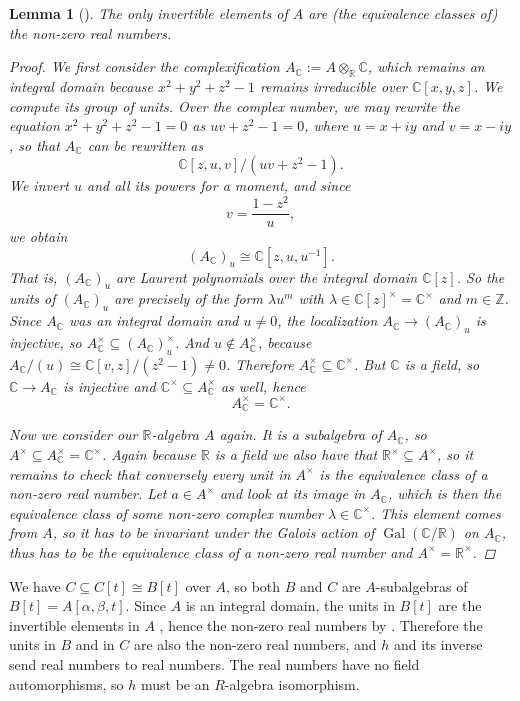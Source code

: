 \documentclass[A4paper, 12pt, british, reqno]{amsart}
\newcommand{\C}{\mathbb{C}} %
\newcommand{\R}{\mathbb{R}} %
\newcommand{\Z}{\mathbb{Z}} %
\theoremstyle{plain}
\newtheorem{lm}[thm]{Lemma}
\theoremstyle{definition}
\theoremstyle{remark}
\theoremstyle{plain}
\theoremstyle{definition}
\theoremstyle{remark}
\theoremstyle{plain}
\theoremstyle{definition}
\theoremstyle{remark}
\newcommand{\ot}{\otimes}
\begin{document}
\begin{lm}[{\cite[Lemma 9.1]{swa87}}]\label{lm:units}
    The only invertible elements of $A$ are (the equivalence classes of) the non-zero real numbers.
    \begin{proof}
	We first consider the complexification $A_{\C}:=A\ot_{\R}\C$, which remains an integral domain because $x^{2}+y^{2}+z^{2}-1$ remains irreducible over $\C[x,y,z]$.
	We compute its group of units.
	Over the complex number, we may rewrite the equation $x^{2}+y^{2}+z^{2}-1=0$ as $uv+z^{2}-1=0$, where $u=x+iy$ and $v=x-iy$, so that $A_{\C}$ can be rewritten as
	\[ \C[z,u,v]/(uv+z^{2}-1). \]
	We invert $u$ and all its powers for a moment, and since
	\[ v=\frac{1-z^{2}}{u}, \]
	we obtain
	\[ (A_{\C})_{u}\cong \C[z,u,u^{-1}]. \]
	That is, $(A_{\C})_{u}$ are Laurent polynomials over the integral domain $\C[z]$.
	So the units of $(A_{\C})_{u}$ are precisely of the form $\lambda u^{m}$ with $\lambda\in \C[z]^{\times}=\C^{\times}$ and $m\in \Z$.
	Since $A_{\C}$ was an integral domain and $u\neq 0$, the localization $A_{\C}\to (A_{\C})_{u}$ is injective, so $A_{\C}^{\times}\subseteq (A_{\C})_{u}^{\times}$.
	And $u\not\in A_{\C}^{\times}$, because $A_{\C}/(u)\cong \C[v,z]/(z^{2}-1)\neq 0$.
	Therefore $A_{\C}^{\times}\subseteq \C^{\times}$.
	But $\C$ is a field, so $\C\to A_{\C}$ is injective and $\C^{\times}\subseteq A_{\C}^{\times}$ as well, hence
	\[ A_{\C}^{\times}=\C^{\times}. \]

	Now we consider our $\R$-algebra $A$ again.
	It is a subalgebra of $A_{\C}$, so $A^{\times}\subseteq A_{\C}^{\times}=\C^{\times}$.
	Again because $\R$ is a field we also have that $\R^{\times}\subseteq A^{\times}$, so it remains to check that conversely every unit in $A^{\times}$ is the equivalence class of a non-zero real number.
	Let $a\in A^{\times}$ and look at its image in $A_{\C}$, which is then the equivalence class of some non-zero complex number $\lambda\in \C^{\times}$.
	This element comes from $A$, so it has to be invariant under the Galois action of $\operatorname{Gal}(\C/\R)$ on $A_{\C}$, thus has to be the equivalence class of a non-zero real number and $A^{\times}=\R^{\times}$.
    \end{proof}
\end{lm}

We have $C\subseteq C[t]\cong B[t]$ over $A$, so both $B$ and $C$ are $A$-subalgebras of $B[t]=A[\alpha,\beta,t]$.
Since $A$ is an integral domain, the units in $B[t]$ are the invertible elements in $A$ \cite[Exercise 2 of \S 1]{am69}, hence the non-zero real numbers by .
Therefore the units in $B$ and in $C$ are also the non-zero real numbers, and $h$ and its inverse send real numbers to real numbers.
The real numbers have no field automorphisms, so $h$ must be an $R$-algebra isomorphism.
\end{document}

